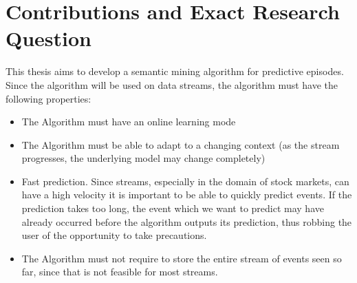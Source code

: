 

\section{Contributions and Exact Research Question}
This thesis aims to develop a semantic mining algorithm for predictive episodes. Since the algorithm will be used on data streams, the algorithm must have the following properties:
\begin{itemize}
	\item The Algorithm must have an online learning mode
	\item The Algorithm must be able to adapt to a changing context (as the stream progresses, the underlying model may change completely)
	\item Fast prediction. Since streams, especially in the domain of stock markets, can have a high velocity it is important to be able to quickly predict events. If the prediction takes too long, the event which we want to predict may have already occurred before the algorithm outputs its prediction, thus robbing the user of the opportunity to take precautions.
	\item The Algorithm must not require to store the entire stream of events seen so far, since that is not feasible for most streams.
\end{itemize}

